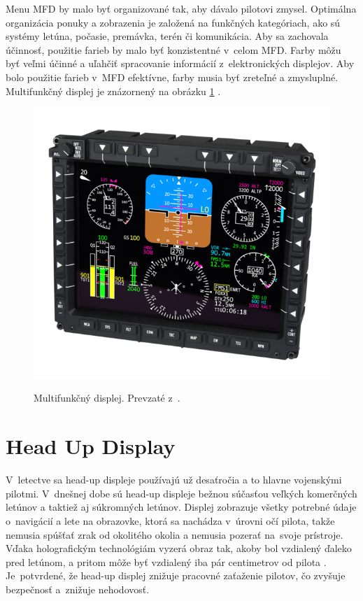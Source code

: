 Menu MFD by malo byť organizované tak, aby dávalo pilotovi zmysel. Optimálna organizácia ponuky a zobrazenia je založená na funkčných kategóriach, ako sú systémy letúna, počasie, premávka, terén či komunikácia. Aby sa zachovala účinnosť, použitie farieb by malo byť konzistentné v~celom MFD. Farby môžu byť veľmi účinné a uľahčiť spracovanie informácií z~elektronických displejov. Aby bolo použitie farieb v~MFD efektívne, farby musia byť zreteľné a zmysluplné. Multifunkčný displej je znázornený na obrázku \ref{MFD} \cite{MFD}.

\begin{figure}[ht]
\centering
\includegraphics[scale=0.35]{obrazky-figures/MFD.png}
\caption{Multifunkčný displej. Prevzaté z~\cite{fotoMFD}.}{\label{MFD}}
\end{figure}
\newpage

\section{Head Up Display}
V~letectve sa head-up displeje používajú už desaťročia a to hlavne vojenskými pilotmi. V~dnešnej dobe sú head-up displeje bežnou súčasťou veľkých komerčných letúnov a taktiež aj súkromných letúnov. Displej zobrazuje všetky potrebné údaje o~navigácií a lete na obrazovke, ktorá sa nachádza v~úrovni očí pilota, takže nemusia spúšťať zrak od okolitého okolia a nemusia pozerať na~svoje prístroje. Vďaka holografickým technológiám vyzerá obraz tak, akoby bol vzdialený ďaleko pred letúnom, a pritom môže byť vzdialený iba pár centimetrov od pilota \cite{SafetyHUD}. Je~potvrdené, že head-up displej znižuje pracovné zaťaženie pilotov, čo zvyšuje bezpečnosť a~znižuje nehodovosť.

